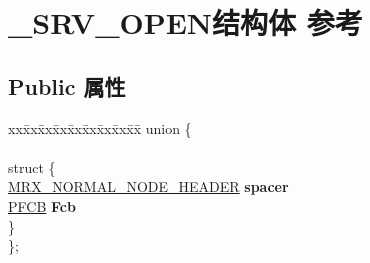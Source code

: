 \hypertarget{struct___s_r_v___o_p_e_n}{}\section{\+\_\+\+S\+R\+V\+\_\+\+O\+P\+E\+N结构体 参考}
\label{struct___s_r_v___o_p_e_n}
\subsection*{Public 属性}
\begin{DoxyCompactItemize}
\item 
\mbox{\label{struct___s_r_v___o_p_e_n_a58fdebbb90e6cf44edaaf1b9fea7d01f}} 
\begin{tabbing}
xx\=xx\=xx\=xx\=xx\=xx\=xx\=xx\=xx\=\kill
union \{\\
\\
\mbox{\label{union___s_r_v___o_p_e_n_1_1_0D1588_a535810017f628a7d5f4b38c1b2797456}} 
\>struct \{\\
\>\>\hyperlink{struct___m_r_x___n_o_r_m_a_l___n_o_d_e___h_e_a_d_e_r}{MRX\_NORMAL\_NODE\_HEADER} {\bfseries spacer}\\
\>\>\hyperlink{struct___f_c_b}{PFCB} {\bfseries Fcb}\\
\>\} \\
\}; \\


\end{tabbing}
\end{DoxyCompactItemize}
